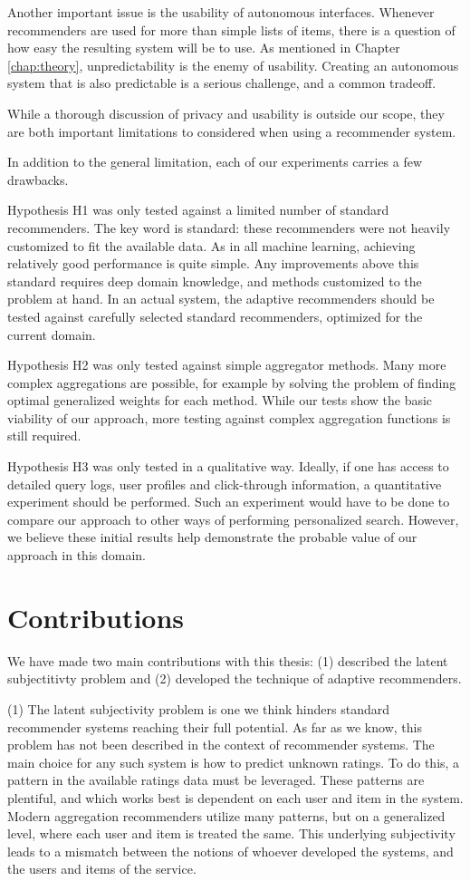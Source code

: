 Another important issue is the usability of autonomous interfaces.
Whenever recommenders are used for more than simple lists of items,
there is a question of how easy the resulting system will be to use.
As mentioned in Chapter \ref{chap:theory},
unpredictability is the enemy of usability.
Creating an autonomous system that is also
predictable is a serious challenge, and a common tradeoff.

While a thorough discussion of privacy and usability is 
outside our scope, they are both important limitations to considered
when using a recommender system.

In addition to the general limitation, each of our experiments
carries a few drawbacks.

Hypothesis H1 was only tested against a limited number of standard recommenders.
The key word is standard: these recommenders were not heavily customized
to fit the available data. As in all machine learning,
achieving relatively good performance is quite simple.
Any improvements above this standard requires deep domain knowledge,
and methods customized to the problem at hand.
In an actual system, the adaptive recommenders should be tested
against carefully selected standard recommenders,
optimized for the current domain.

Hypothesis H2 was only tested against simple aggregator methods.
Many more complex aggregations are possible,
for example by solving the problem of finding
optimal generalized weights for each method.
While our tests show the basic viability of our approach,
more testing against complex aggregation functions
is still required.

Hypothesis H3 was only tested in a qualitative way.
Ideally, if one has access to detailed query logs,
user profiles and click-through information,
a quantitative experiment should be performed.
Such an experiment would have to be done
to compare our approach to other ways of performing
personalized search.
However, we believe these initial results
help demonstrate the probable value of our approach
in this domain.


\section{Contributions} 

We have made two main contributions with this thesis:
(1) described the latent subjectitivty problem and
(2) developed the technique of adaptive recommenders.

(1) The latent subjectivity problem is one we think hinders
standard recommender systems reaching their full potential.
As far as we know, this problem has not been described
in the context of recommender systems.
The main choice for any such system is how to predict unknown ratings.
To do this, a pattern in the available ratings data must be leveraged.
These patterns are plentiful, and which works best is dependent on
each user and item in the system.
Modern aggregation recommenders utilize many patterns, but on a generalized
level, where each user and item is treated the same.
This underlying subjectivity leads to a mismatch between the notions
of whoever developed the systems, and the users and items of the service.

